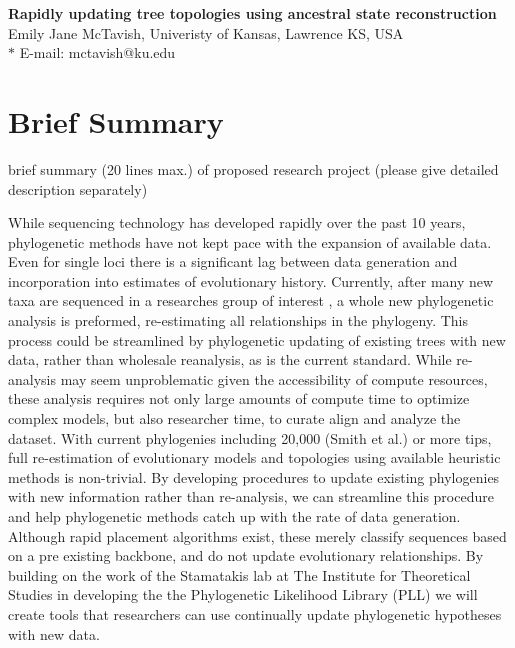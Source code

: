 \documentclass[10pt]{article}
\date{}
\begin{document}
\begin{flushleft}
{\Large
\textbf{Rapidly updating tree topologies using ancestral state reconstruction}
}
\\
Emily Jane McTavish, Univeristy of Kansas, Lawrence KS, USA
\\

$\ast$ E-mail: mctavish@ku.edu
\end{flushleft}

\section*{Brief Summary}

brief summary (20 lines max.) of proposed research project (please give detailed description separately)

While sequencing technology has developed rapidly over the past 10 years, phylogenetic methods have not kept pace with the expansion of available data. Even for single loci there is a significant lag between data generation and incorporation into estimates of evolutionary history. Currently, after many new taxa are sequenced in a researches group of interest , a whole new phylogenetic analysis is preformed, re-estimating all relationships in the phylogeny. This process could be streamlined by phylogenetic updating of existing trees with new data, rather than wholesale reanalysis, as is the current standard. While re-analysis may seem unproblematic given the accessibility of compute resources, these analysis requires not only large amounts of compute time to optimize complex models, but also researcher time, to curate align and analyze the dataset. With current phylogenies including 20,000 (Smith et al.) or more tips, full re-estimation of evolutionary models and topologies using available heuristic methods is non-trivial.  By developing procedures to update existing phylogenies with new information rather than re-analysis, we can streamline this procedure and help phylogenetic methods catch up with the rate of data generation. Although rapid placement algorithms exist, these merely classify sequences based on a pre existing backbone, and do not update evolutionary relationships. By building on the work of the Stamatakis lab at The Institute for Theoretical Studies in developing the the Phylogenetic Likelihood Library (PLL) we will create tools that researchers can use continually update phylogenetic hypotheses with new data.
\end{document}
